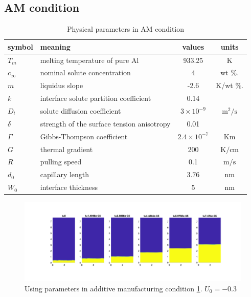 \documentclass[final,times]{elsarticle}
\numberwithin{equation}{section}
\begin{document}
\subsection{AM condition}
\begin{table}
\centering
\caption{Physical parameters in AM condition}
\begin{tabular}{l l c c }
\toprule
symbol & meaning & values & units \\
\midrule
$T_m$ & melting temperature of pure Al & 933.25  & K \\
$c_{\infty}$ & nominal solute concentration &  4 & wt $\%$. \\
$m$ &liquidus slope &  -2.6 & K/wt $\%$. \\
$k$ & interface solute partition coefficient & 0.14 &\\
$D_l$ & solute diffusion coefficient &  $3\times 10^{-9}$  & ${\text{m}}^2/\text{s}$ \\
$\delta$ & strength of the surface tension anisotropy  &  0.01  &\\
$\Gamma$ & Gibbs-Thompson coefficient & $2.4\times 10^{-7}$ & Km \\
$G$ & thermal gradient & 200 & $\text{K} / \text{cm}$ \\
$R$ & pulling speed &  0.1 & $\text{m} / \text{s}$ \\
$d_0$ & capillary length & $ 3.76$  & nm \\
$W_0$ & interface thickness  & 5 & nm \\
\bottomrule
\end{tabular}\label{tab:AM}
\end{table}

\begin{figure}[h]
\centering
\includegraphics[width=1\linewidth]{./figures/AM_condition.png}
\caption{Using parameters in additive manufacturing condition \ref{tab:AM}. $U_0=-0.3$}
\end{figure}
\end{document}
